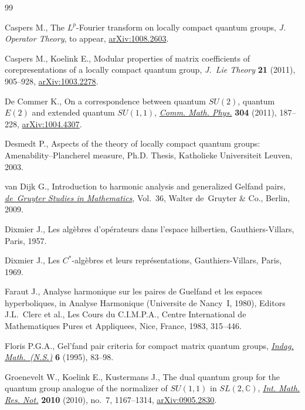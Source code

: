 \documentclass[pdftex]{sigma}
\numberwithin{equation}{section}
\theoremstyle{definition}
\begin{document}
\begin{thebibliography}{99}

\footnotesize\itemsep=0pt

  Caspers M.,
  The $L^p$-Fourier transform on locally compact quantum groups,
 \emph{J. Operator Theory},   to appear,
\href{http://arxiv.org/abs/1008.2603}{arXiv:1008.2603}.

 Caspers  M., Koelink E.,
  Modular properties of matrix coef\/f\/icients of corepresentations of a locally compact quantum group,
  \emph{J.~Lie Theory} {\bf 21} (2011), 905--928,
\href{http://arxiv.org/abs/1003.2278}{arXiv:1003.2278}.

 De Commer  K.,
  On a correspondence between quantum $SU(2)$, quantum $E(2)$ and extended quantum $SU(1,1)$,
\href{http://dx.doi.org/10.1007/s00220-011-1208-y}{\emph{Comm. Math. Phys.}} {\bf 304} (2011), 187--228,
  \href{http://arxiv.org/abs/1004.4307}{arXiv:1004.4307}.

  Desmedt P.,
  Aspects of the theory of locally compact quantum groups: Amenability--Plancherel measure, Ph.D. Thesis,
  Katholieke Universiteit Leuven, 2003.

 van Dijk  G.,
  Introduction to harmonic analysis and generalized Gelfand pairs,
\href{http://dx.doi.org/10.1515/9783110220209}{{\it de~Gruyter Studies in Mathematics}}, Vol.~36, Walter de~Gruyter \& Co., Berlin, 2009.

 Dixmier  J.,
  Les alg\`ebres d'op\'erateurs dans l'espace hilbertien,
  Gauthiers-Villars, Paris, 1957.

 Dixmier  J.,
  Les $C^*$-alg\`ebres et leurs repr\'esentations,
  Gauthiers-Villars, Paris, 1969.

  Faraut J.,
  Analyse harmonique sur les paires de Guelfand et les espaces hyperboliques,
in Analyse Harmonique (Universite de Nancy~I, 1980), Editors J.L.~Clerc et al., Les Cours du C.I.M.P.A., Centre International de Mathematiques Pures et Appliquees, Nice, France,
1983, 315--446.

  Floris P.G.A.,
  Gel'fand pair criteria for compact matrix quantum groups,
  \href{http://dx.doi.org/10.1016/0019-3577(95)98202-M}{\emph{Indag. Math.~(N.S.)}} {\bf 6} (1995), 83--98.

 Groenevelt  W., Koelink E., Kustermans J.,
  The dual quantum group for the quantum group analogue of the normalizer of $SU(1,1)$ in $SL(2, \mathbb{C})$,
  \href{http://dx.doi.org/10.1093/imrn/rnp173}{\emph{Int. Math. Res. Not.}} {\bf 2010} (2010), no.~7, 1167--1314,
\href{http://arxiv.org/abs/0905.2830}{arXiv:0905.2830}.


\end{thebibliography}
\end{document}
